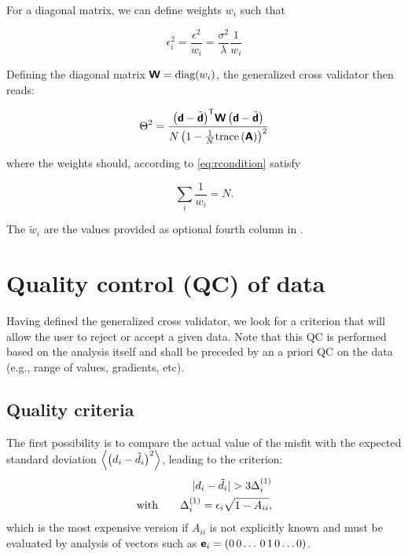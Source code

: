 For a diagonal matrix, we can define weights $w_i$ such that

\begin{equation}
\epsilon^2_i = \frac{\epsilon^2}{w_i}= \frac{\sigma^2}{\lambda}\frac{1}{w_i}
\end{equation}

Defining the diagonal matrix $\mbox{\boldmath $ \protect\mathsf{W} $} = \mbox{diag}(w_i)$, the generalized cross validator then reads:

\begin{equation}
\Theta^2=\frac{ {\left(\mbox{\boldmath $ \protect\mathsf{d} $}-\tilde{\mbox{\boldmath $ \protect\mathsf{d} $}}\right)}^\mathsf{T} \mbox{\boldmath $ \protect\mathsf{W} $} \left(\mbox{\boldmath $ \protect\mathsf{d} $}-\tilde{\mbox{\boldmath $ \protect\mathsf{d} $}}\right) }{ N \left(1 - \frac{1}{N}\mathrm{trace}\left( \mbox{\boldmath $ \protect\mathsf{A} $} \right)\right)^2} 
\label{eq:gcvbis}
\end{equation}

where the weights should, according to \eqref{eq:rcondition} satisfy

\begin{equation}
\sum_i \frac{1 }{w_i} = N.
\label{eq:condition}
\end{equation}

The $\tilde{w}_i$ are the values provided as optional fourth column in .

\section{Quality control (QC) of data\label{secdivaqc}}

Having defined the generalized cross validator, we look for a criterion that will allow the user to reject or accept a given data. Note that this QC is performed based on the analysis itself and shall be preceded by an a priori QC on the data (e.g., range of values, gradients, etc). 

\subsection{Quality criteria}

The first possibility is to compare the actual value of the misfit with the expected standard deviation $\left\langle \left(d_i - \tilde{d}_i\right)^2 \right\rangle$, leading to the criterion:
\begin{eqnarray}
| d_i - \tilde{d}_i | > 3 \Delta_i^{(1)}\\
\textrm{with}  \qquad \Delta_i^{(1)} = \epsilon_i \sqrt{1-A_{ii}},\label{eq:qc1}
\end{eqnarray}
which is the most expensive version if $A_{ii}$ is not explicitly known and must be evaluated by analysis of vectors such as $\mbox{\boldmath $ \protect\mathsf{e} $}_i=(0\,0\ldots\,0\,1\,0\ldots 0)$. 

